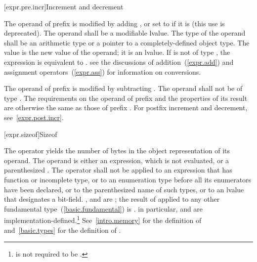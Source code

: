 [expr.pre.incr]{Increment and decrement}

\pnum
{}%
%
The operand of prefix \tcode{++}
%
%
is modified by adding ,
%
%
%
or set to  if it is  (this use is deprecated).
The operand shall be a modifiable lvalue. The type of the operand shall
be an arithmetic type or a pointer to a completely-defined object type.
The value is the new value of the operand; it is an lvalue.
If  is not of type , the expression  is
equivalent to .
%
\enternote
see the discussions of addition~(\ref{expr.add}) and assignment
operators~(\ref{expr.ass}) for information on conversions.
\exitnote 

\pnum
The operand of prefix
%
\tcode{\dcr} is modified by subtracting . The operand shall not
be of type . The requirements on the operand of prefix
\tcode{\dcr} and the properties of its result are otherwise the same as
those of prefix \tcode{++}.
\enternote 
For postfix increment and decrement, see~\ref{expr.post.incr}.
\exitnote 

[expr.sizeof]{Sizeof}

\pnum
{}%
%
%
The  operator yields the number of bytes in the object
representation of its operand. The operand is either an expression,
which is not evaluated, or a parenthesized .
%
The  operator shall not be applied to an expression that
has function or incomplete type, or to an enumeration type before all
its enumerators have been declared, or to the parenthesized name of such
types, or to an lvalue that designates a bit-field.
,  and
 are ; the result of
 applied to any other fundamental
type~(\ref{basic.fundamental}) is .
\enternote 
in particular,  and  are
implementation-defined.\footnote{ is not required to be .}
\exitnote 
\enternote 
See~\ref{intro.memory} for the definition of 
and~\ref{basic.types} for the definition of .
\exitnote 

